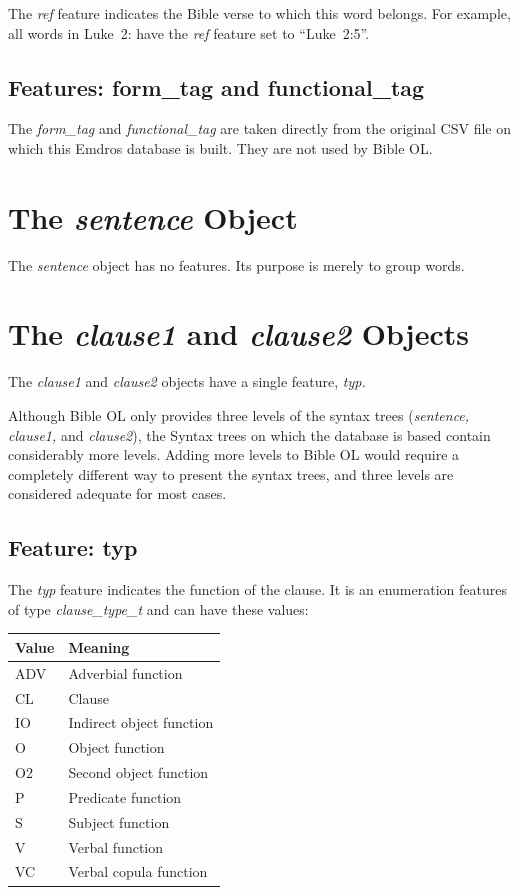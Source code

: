 \documentclass[11pt,oneside,a4paper]{memoir}
\newcommand*{\bibleref}[3]{#1~#2\thinspace:\thinspace#3}
\begin{document}
The \emph{ref} feature indicates the Bible verse to which this word belongs. For example, all words
in \bibleref{Luke}{2}{5} have the \emph{ref} feature set to ``Luke~2:5''.

\subsection{Features: form\_tag and functional\_tag}

The \emph{form\_tag} and \emph{functional\_tag} are taken directly from the original CSV file on
which this Emdros database is built. They are not used by Bible OL.

\section{The \emph{sentence} Object}

The \emph{sentence} object has no features. Its purpose is merely to group words.

\section{The \emph{clause1} and \emph{clause2} Objects}

The \emph{clause1} and \emph{clause2} objects have a single feature, \emph{typ.}

Although Bible OL only provides three levels of the syntax trees (\emph{sentence, clause1,} and
\emph{clause2}), the Syntax trees on which the database is based contain considerably more levels.
Adding more levels to Bible OL would require a completely different way to present the syntax trees,
and three levels are considered adequate for most cases.

\subsection{Feature: typ}

The \emph{typ} feature indicates the function of the clause. It is an enumeration features of
type \emph{clause\_type\_t} and can have these values:

\begin{center}
  \begin{tabular}{ll}
    \textbf{Value} & \textbf{Meaning}\\
    \hline
    ADV & Adverbial function\\
    CL  & Clause\\
    IO  & Indirect object function\\
    O   & Object function\\
    O2  & Second object function\\
    P   & Predicate function\\
    S   & Subject function\\
    V   & Verbal function\\
    VC  & Verbal copula function\\
  \end{tabular}
\end{center}
\end{document}
